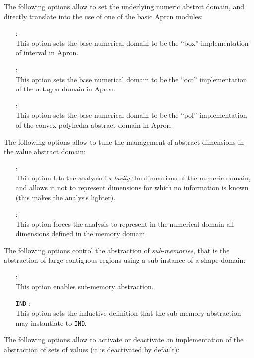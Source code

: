 The following options allow to set the underlying numeric abstrct
domain, and directly translate into the use of one of the basic
Apron modules:
\begin{itemize}
\item[\doption{-nd-box}]: \\
  This option sets the base numerical domain to be the ``box''
  implementation of interval in Apron.
\item[\doption{-nd-oct}]: \\
  This option sets the base numerical domain to be the ``oct''
  implementation of the octagon domain in Apron.
\item[\doption{-nd-pol}]: \\
  This option sets the base numerical domain to be the ``pol''
  implementation of the convex polyhedra abstract domain in Apron.
\end{itemize}
The following options allow to tune the management of abstract dimensions
in the value abstract domain:
\begin{itemize}
\item[\doption{-dynenv-yes}] \optadv: \\
  This option lets the analysis fix {\em lazily} the dimensions of the
  numeric domain, and allows it not to represent dimensions for which
  no information is known (this makes the analysis lighter).
\item[\doption{-dynenv-no}] \optadv: \\
  This option forces the analysis to represent in the numerical domain
  all dimensions defined in the memory domain.
\end{itemize}
The following options control the abstraction of {\em sub-memories},
that is the abstraction of large contiguous regions using a sub-instance
of a shape domain:
\begin{itemize}
\item[\doption{-add-submem}] \optadv: \\
  This option enables sub-memory abstraction.
\item[\doption{-submem-ind} \texttt{IND}] \optadv: \\
  This option sets the inductive definition that the sub-memory abstraction
  may instantiate to \texttt{IND}.
\end{itemize}
The following options allow to activate or deactivate an implementation
of the abstraction of sets of values (it is deactivated by default):
